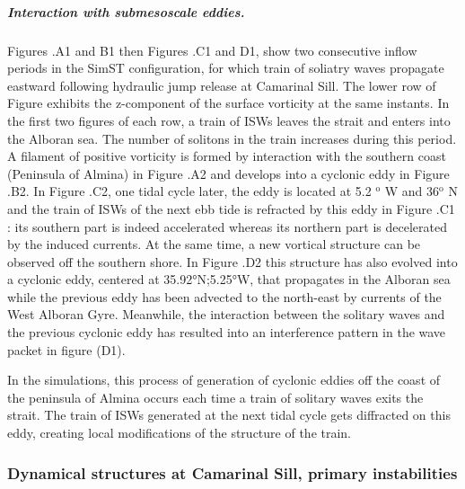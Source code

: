 \subparagraph{Interaction with submesoscale eddies.}
Figures .A1 and B1 then Figures .C1 and D1, show two consecutive inflow periods in the SimST configuration, for which train of soliatry waves propagate eastward following hydraulic jump release at Camarinal Sill. The lower row of Figure  exhibits the z-component of the surface vorticity at the same instants. In the first two figures of each row, a train of ISWs leaves the strait and enters into the Alboran sea. The number of solitons in the train increases during this period. A filament of positive vorticity is formed by interaction with the southern coast (Peninsula of Almina) in Figure .A2 and develops into a cyclonic eddy in Figure .B2. In Figure .C2, one tidal cycle later, the eddy is located at 5.2 $^\text{o}$ W and 36$^\text{o}$ N and the train of ISWs of the next ebb tide is refracted by this eddy in Figure .C1 : its southern part is indeed accelerated whereas its northern part is decelerated by the induced currents. At the same time, a new vortical structure can be observed off the southern shore. In Figure .D2 this structure has also evolved into a cyclonic eddy, centered at 35.92°N;5.25°W, that propagates in the Alboran sea while the previous eddy has been advected to the north-east by currents of the West Alboran Gyre. Meanwhile, the interaction between the solitary waves and the previous cyclonic eddy has resulted into an interference pattern in the wave packet in figure (D1). 

In the simulations, this process of generation of cyclonic eddies off the coast of the peninsula of Almina occurs each time a train of solitary waves exits the strait. The train of ISWs generated at the next tidal cycle gets diffracted on this eddy, creating local modifications of the structure of the train.

\subsubsection{Dynamical structures at Camarinal Sill, primary instabilities}
\label{sectionsim3D_res_insta}

